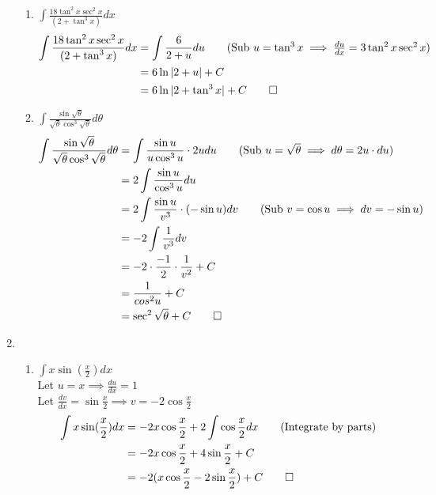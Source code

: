 \documentclass[12pt, a4paper]{article}
\begin{document}
\begin{enumerate}[Q\arabic*.]
\begin{enumerate}[(\alph*)]
    \item $\displaystyle \int \frac{18\tan^2x\sec^2x}{(2+\tan^3x)} dx$
      \begin{align*}
        \int \frac{18\tan^2x\sec^2x}{(2+\tan^3x)} dx &= \int \frac{6}{2+u} du\tag*{(Sub $u = \tan^3x \implies \frac{du}{dx} = 3\tan^2x\sec^2x$)}\\
                                                     &= 6\ln|2+u| + C\\
                                                     &= 6\ln|2 + \tan^3x| + C \qed
      \end{align*}

    \item $\displaystyle \int \frac{\sin \sqrt{\theta}}{\sqrt{\theta}\cos^3\sqrt{\theta}} d\theta$
      \begin{align*}
        \int \frac{\sin \sqrt{\theta}}{\sqrt{\theta}\cos^3\sqrt{\theta}} d\theta &= \int \frac{\sin u}{u \cos^3 u}\cdot2udu\tag*{(Sub $u = \sqrt{\theta} \implies d\theta = 2u \cdot du$)}\\ 
                                                                                 &= 2\int \frac{\sin u}{\cos^3 u} du\\
                                                                                 &= 2\int \frac{\sin u}{v^3} \cdot (-\sin u) dv\tag*{(Sub $v = \cos u \implies dv = -\sin u$)}\\
                                                                                 &= -2 \int \frac{1}{v^3}dv\\
                                                                                 &= -2 \cdot \frac{-1}{2} \cdot \frac{1}{v^2} + C\\
                                                                                 &= \frac{1}{cos^2u} + C\\
                                                                                 &= \sec^2\sqrt{\theta} + C\qed
      \end{align*}
    \end{enumerate}

  \pagebreak
  \item 
    \begin{enumerate}[(\alph*)]
      \item $\displaystyle \int x \sin(\frac{x}{2})dx$\\
        Let $u = x \implies \frac{du}{dx} = 1$\\ Let $\frac{dv}{dx} = \sin \frac{x}{2} \implies v = -2\cos \frac{x}{2}$
        \begin{align*}
          \int x \sin(\frac{x}{2}) dx &= -2x\cos \frac{x}{2} + 2 \int \cos \frac{x}{2} dx\tag*{(Integrate by parts)}\\
                                      &= -2x\cos \frac{x}{2} + 4\sin \frac{x}{2} + C\\
                                      &= -2(x\cos \frac{x}{2}-2\sin \frac{x}{2}) + C \qed
        \end{align*}


\end{enumerate}
\end{enumerate}
\end{document}
